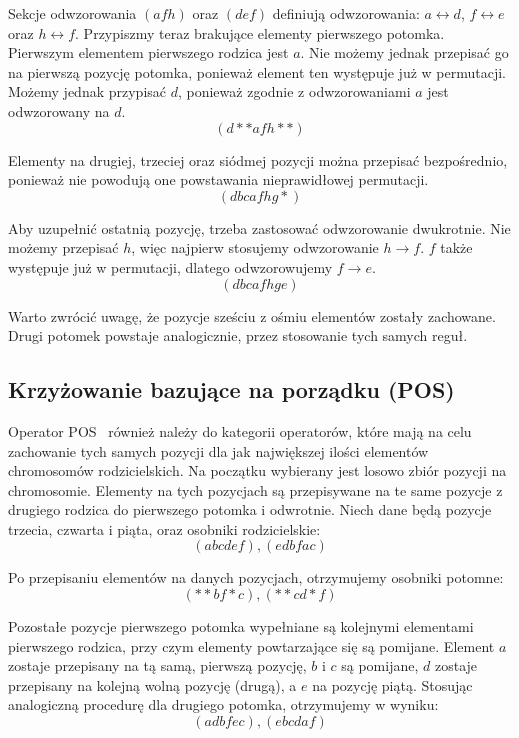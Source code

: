 \documentclass{xmgr}
\begin{document}
Sekcje odwzorowania $ (a f h) $ oraz $ (d e f) $ definiują odwzorowania: $ a \leftrightarrow d $, $ f \leftrightarrow e $ oraz $ h \leftrightarrow f $. Przypiszmy teraz brakujące elementy pierwszego potomka. Pierwszym elementem pierwszego rodzica jest $a$. Nie możemy jednak przepisać go na pierwszą pozycję potomka, ponieważ element ten występuje już w permutacji. Możemy jednak przypisać $d$, ponieważ zgodnie z odwzorowaniami $a$ jest odwzorowany na $d$.
$$ (d * * a f h * *) $$

Elementy na drugiej, trzeciej oraz siódmej pozycji można przepisać bezpośrednio, ponieważ nie powodują one powstawania nieprawidłowej permutacji.
$$ (d b c a f h g *) $$

Aby uzupełnić ostatnią pozycję, trzeba zastosować odwzorowanie dwukrotnie. Nie możemy przepisać $h$, więc najpierw stosujemy odwzorowanie $h \rightarrow f$. $f$ także występuje już w permutacji, dlatego odwzorowujemy $f \rightarrow e$.
$$ (d b c a f h g e) $$

Warto zwrócić uwagę, że pozycje sześciu z ośmiu elementów zostały zachowane. Drugi potomek powstaje analogicznie, przez stosowanie tych samych reguł.


\subsection{Krzyżowanie bazujące na porządku (POS)}

Operator POS~\cite{Syswerda} również należy do kategorii operatorów, które mają na celu zachowanie tych samych pozycji dla jak największej ilości elementów chromosomów rodzicielskich. Na początku wybierany jest losowo zbiór pozycji na chromosomie. Elementy na tych pozycjach są przepisywane na te same pozycje z drugiego rodzica do pierwszego potomka i odwrotnie. Niech dane będą pozycje trzecia, czwarta i piąta, oraz osobniki rodzicielskie:
$$ (a b c d e f), (e d b f a c) $$

Po przepisaniu elementów na danych pozycjach, otrzymujemy osobniki potomne:
$$ (* * b f * c), (* * c d * f) $$

Pozostałe pozycje pierwszego potomka wypełniane są kolejnymi elementami pierwszego rodzica, przy czym elementy powtarzające się są pomijane. Element $a$ zostaje przepisany na tą samą, pierwszą pozycję, $b$ i $c$ są pomijane, $d$ zostaje przepisany na kolejną wolną pozycję (drugą), a $e$ na pozycję piątą. Stosując analogiczną procedurę dla drugiego potomka, otrzymujemy w wyniku:
$$ (a d b f e c), (e b c d a f) $$
\end{document}
